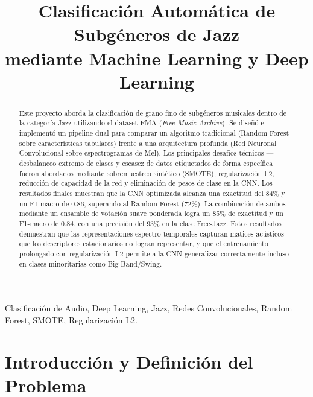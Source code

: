 \documentclass[conference]{IEEEtran}
\begin{document}
\title{Clasificación Automática de Subgéneros de Jazz\\mediante Machine Learning y Deep Learning}

\author{
}

\maketitle

\begin{abstract}
Este proyecto aborda la clasificación de grano fino de subgéneros musicales dentro de la categoría Jazz utilizando el dataset FMA (\textit{Free Music Archive}). Se diseñó e implementó un pipeline dual para comparar un algoritmo tradicional (Random Forest sobre características tabulares) frente a una arquitectura profunda (Red Neuronal Convolucional sobre espectrogramas de Mel). Los principales desafíos técnicos —desbalanceo extremo de clases y escasez de datos etiquetados de forma específica— fueron abordados mediante sobremuestreo sintético (SMOTE), regularización L2, reducción de capacidad de la red y eliminación de pesos de clase en la CNN. Los resultados finales muestran que la CNN optimizada alcanza una exactitud del 84\% y un F1-macro de 0.86, superando al Random Forest (72\%). La combinación de ambos mediante un ensamble de votación suave ponderada logra un 85\% de exactitud y un F1-macro de 0.84, con una precisión del 93\% en la clase Free-Jazz. Estos resultados demuestran que las representaciones espectro-temporales capturan matices acústicos que los descriptores estacionarios no logran representar, y que el entrenamiento prolongado con regularización L2 permite a la CNN generalizar correctamente incluso en clases minoritarias como Big Band/Swing.
\end{abstract}

\begin{IEEEkeywords}
Clasificación de Audio, Deep Learning, Jazz, Redes Convolucionales, Random Forest, SMOTE, Regularización L2.
\end{IEEEkeywords}

\section{Introducción y Definición del Problema}
\end{document}
